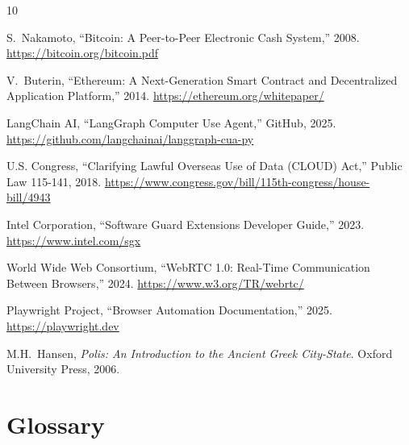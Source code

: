 \documentclass[10pt,twocolumn]{article}
\begin{document}
\begin{thebibliography}{10}

S.\ Nakamoto, ``Bitcoin: A Peer-to-Peer Electronic Cash System,'' 2008.
\url{https://bitcoin.org/bitcoin.pdf}

V.\ Buterin, ``Ethereum: A Next-Generation Smart Contract and Decentralized Application Platform,'' 2014.
\url{https://ethereum.org/whitepaper/}

LangChain AI, ``LangGraph Computer Use Agent,'' GitHub, 2025.
\url{https://github.com/langchainai/langgraph-cua-py}

U.S. Congress, ``Clarifying Lawful Overseas Use of Data (CLOUD) Act,'' Public Law 115-141, 2018.
\url{https://www.congress.gov/bill/115th-congress/house-bill/4943}

Intel Corporation, ``Software Guard Extensions Developer Guide,'' 2023.
\url{https://www.intel.com/sgx}

World Wide Web Consortium, ``WebRTC 1.0: Real-Time Communication Between Browsers,'' 2024.
\url{https://www.w3.org/TR/webrtc/}

Playwright Project, ``Browser Automation Documentation,'' 2025.
\url{https://playwright.dev}

M.H.\ Hansen, \textit{Polis: An Introduction to the Ancient Greek City-State}.
Oxford University Press, 2006.

\end{thebibliography}

\onecolumn
\appendix

\section{Glossary}
\label{app:glossary}
\end{document}
